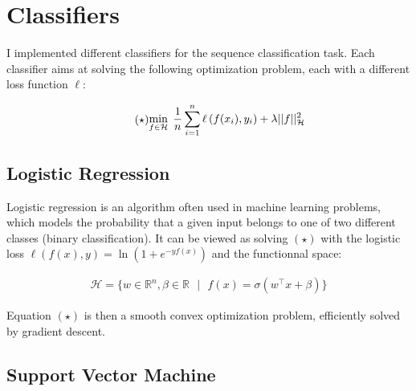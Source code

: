 \documentclass[final]{cvpr}
\begin{document}
	\section{Classifiers}
	
	I implemented different classifiers for the sequence classification task. Each classifier aims at solving the following optimization problem, each with a different loss function $\ell$:

	\vspace{-1.5mm}
	
	\begin{equation*}\tag{$\star$}
		\begin{aligned}
			\min_{f \in \mathcal{H}}  \hspace{1mm} \dfrac{1}{n} \sum_{i=1}^{n} \ell  \left( f(x_i), y_i \right) + \lambda \vert \vert f \vert \vert_\mathcal{H}^2
		\end{aligned}
	\end{equation*}

	\vspace{0.5mm}

	\subsection{Logistic Regression}
	
	Logistic regression is an algorithm often used in machine learning problems, which models the probability that a given input belongs to one of two different classes (binary classification). It can be viewed as solving $(\star)$ with the logistic loss $\ell  \left( f(x), y \right) = \ln \left(1+e^{-yf(x)} \right)$ and the functionnal space:
	
	\vspace{-5mm}
	
	\begin{equation*}
		\begin{aligned}
			\mathcal{H} = \{ w \in \mathbb{R}^n, \beta \in \mathbb{R}  \textit{ } \vert \textit{ } f(x) = \sigma(w^\top x + \beta) \}
		\end{aligned}
	\end{equation*}
	
	\noindent
	Equation $(\star)$ is then a smooth convex optimization problem, efficiently solved by gradient descent.
	
	\subsection{Support Vector Machine} 
	
\end{document}
